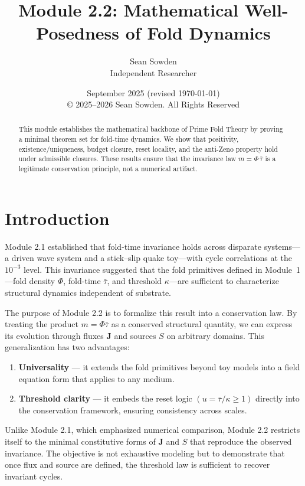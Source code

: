 \documentclass[11pt]{article}
\title{Module 2.2: Mathematical Well-Posedness of Fold Dynamics}
\author{Sean Sowden \\ Independent Researcher}
\date{September 2025 (revised \today) \\[1ex]
© 2025--2026 Sean Sowden. All Rights Reserved}
\begin{document}
\maketitle
\begin{abstract}
This module establishes the mathematical backbone of Prime Fold Theory by 
proving a minimal theorem set for fold-time dynamics. We show that positivity,
existence/uniqueness, budget closure, reset locality, and the anti-Zeno property 
hold under admissible closures. %
These results ensure that the invariance law $m = \Phi\, \bar{\tau}$ is a legitimate conservation principle, not a numerical artifact.

\end{abstract}

\tableofcontents
\newpage

\section{Introduction}
Module 2.1 established that fold-time invariance holds across disparate systems---a driven wave system and a stick--slip quake toy---with cycle correlations at the $10^{-3}$ level. This invariance suggested that the fold primitives defined in Module~1---fold density $\Phi$, fold-time $\bar{\tau}$, and threshold $\kappa$---are sufficient to characterize structural dynamics independent of substrate.

The purpose of Module 2.2 is to formalize this result into a conservation law. By treating the product $m = \Phi \bar{\tau}$ as a conserved structural quantity, we can express its evolution through fluxes $\mathbf{J}$ and sources $S$ on arbitrary domains. This generalization has two advantages:

\begin{enumerate}
    \item \textbf{Universality} --- it extends the fold primitives beyond toy models into a field equation form that applies to any medium.
    \item \textbf{Threshold clarity} --- it embeds the reset logic $(u = \bar{\tau}/\kappa \geq 1)$ directly into the conservation framework, ensuring consistency across scales.
\end{enumerate}

Unlike Module 2.1, which emphasized numerical comparison, Module 2.2 restricts itself to the minimal constitutive forms of $\mathbf{J}$ and $S$ that reproduce the observed invariance. The objective is not exhaustive modeling but to demonstrate that once flux and source are defined, the threshold law is sufficient to recover invariant cycles.
\end{document}
